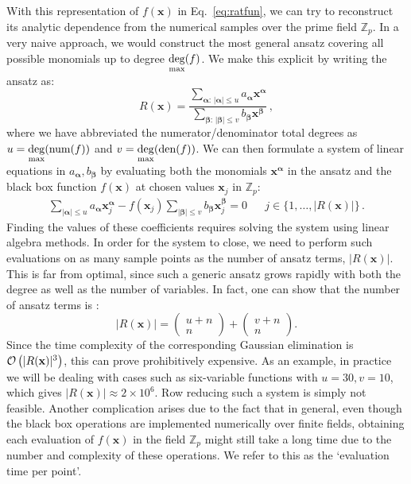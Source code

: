 \documentclass[main.tex]{subfiles}
\begin{document}
With this representation of $f(\mathbf{x})$ in Eq.~\ref{eq:ratfun}, we can try to reconstruct its analytic dependence from the numerical samples over the prime field $\mathbb{Z}_p$. In a very naive approach, we would construct the most general ansatz covering all possible monomials up to degree $\underset{\text{max}}{\deg} (f)$. We make this explicit by writing the ansatz as:
\begin{equation}
    R(\mathbf{x}) = \frac{
    \sum\limits_{\bm{\alpha}:\, |\bm{\alpha}| \le u} a_{\bm{\alpha}} \mathbf{x}^{\bm{\alpha}}
    }{
    \sum\limits_{\bm{\beta}:\, |\bm{\beta}| \le v} b_{\bm{\beta}} \mathbf{x}^{\bm{\beta}}
    }\,,
\end{equation}
where we have abbreviated the numerator/denominator total degrees as $u=\underset{\text{max}}{\deg}(\text{num}(f))$ and $v=\underset{\text{max}}{\deg}(\text{den}(f))$. We can then formulate a system of linear equations in $a_{\bm{\alpha}}, b_{\bm{\beta}}$ by evaluating both the monomials $\mathbf{x}^{\bm{\alpha}}$ in the ansatz and the black box function $f(\mathbf{x})$ at chosen values $\mathbf{x}_j$ in $\mathbb{Z}_p$:
\begin{align}
    \sum_{|\bm{\alpha}| \le u} a_{\bm{\alpha}} \mathbf{x}_j^{\bm{\alpha}} - 
    f(\mathbf{x}_j) \sum_{|\bm{\beta}| \le v} b_{\bm{\beta}} \mathbf{x}_j^{\bm{\beta}} = 0 
&&    
j \in \{1, \ldots, |R(\mathbf{x})|\} \,.
\end{align}
Finding the values of these coefficients requires solving the system using linear algebra methods. In order for the system to close, we need to perform such evaluations on as many sample points as the number of ansatz terms, $|R(\mathbf{x})|$. This is far from optimal, since such a generic ansatz grows rapidly with both the degree as well as the number of variables. In fact, one can show that the number of ansatz terms is \cite{benpageSAGEX}:
\begin{equation} \label{eq:naiveansatzlength}
    |R(\mathbf{x})| = 
    \begin{pmatrix}
        u + n \\
        n
    \end{pmatrix}
    +
    \begin{pmatrix}
        v + n \\
        n
    \end{pmatrix}.
\end{equation}
Since the time complexity of the corresponding Gaussian elimination is $\mathcal{O}\left(|R(\mathbf{x})|^3\right)$, this can prove prohibitively expensive. As an example, in practice we will be dealing with cases such as six-variable functions with $u=30, v=10$, which gives $|R(\mathbf{x})| \approx 2\times 10^6$. Row reducing such a system is simply not feasible. Another complication arises due to the fact that in general, even though the black box operations are implemented numerically over finite fields, obtaining each evaluation of $f(\mathbf{x})$ in the field $\mathbb{Z}_p$ might still take a long time due to the number and complexity of these operations. We refer to this as the `evaluation time per point'.
\end{document}
